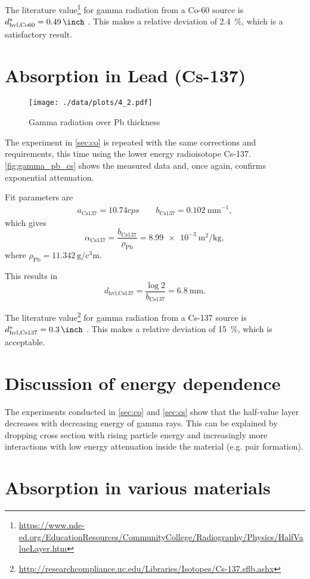The literature value\footnote{\url{https://www.nde-ed.org/EducationResources/CommunityCollege/Radiography/Physics/HalfValueLayer.htm}} for gamma radiation from a Co-60 source is $d_\text{hvl,Co60}^{*}=\SI{0.49}{\inch}$ .
This makes a relative deviation of \SI{2.4}{\percent}, which is a satisfactory result.

\section{Absorption in Lead (Cs-137)}\label{sec:cs}
\begin{figure}[ht!]
	\centering
	\texttt{[image: ./data/plots/4\_2.pdf]}
	\caption[Gamma radiation over Pb thickness]{Gamma radiation over Pb thickness}
	\label{fig:gamma_pb_cs}
\end{figure}

The experiment in \autoref{sec:co} is repeated with the same corrections and requirements, this time using the lower energy radioisotope Cs-137.
\autoref{fig:gamma_pb_cs} shows the measured data and, once again, confirms exponential attenuation.

Fit parameters are
\begin{gather*}
	a_\text{Cs137}=\num{10.74}cps\qquad b_\text{Cs137}=\SI{0.102}{\milli\meter}^{-1},
\end{gather*}
which gives
\begin{equation*}
	\alpha_\text{Cs137}=\frac{b_\text{Cs137}}{\rho_\text{Pb}}=\SI{8.99e-3}{\meter\squared\per\kilogram},
\end{equation*}
where $\rho_\text{Pb}=\SI{11.342}{\gram\per\cubic\centi\meter}$.

This results in
\begin{equation*}
	d_\text{hvl,Cs137}=\frac{\log{2}}{b_\text{Cs137}}=\SI{6.8}{\milli\meter}.
\end{equation*}

The literature value\footnote{\url{http://researchcompliance.uc.edu/Libraries/Isotopes/Cs-137.sflb.ashx}} for gamma radiation from a Cs-137 source is $d_\text{hvl,Cs137}^{*}=\SI{0.3}{\inch}$ .
This makes a relative deviation of \SI{15}{\percent}, which is acceptable.

\section{Discussion of energy dependence}
The experiments conducted in \autoref{sec:co} and \autoref{sec:cs} show that the half-value layer decreases with decreasing energy of gamma rays.
This can be explained by dropping cross section with rising particle energy and increasingly more interactions with low energy attenuation inside the material (e.g. pair formation).

\section{Absorption in various materials}
